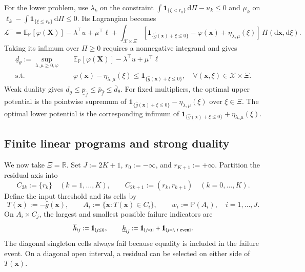 \documentclass[review,11pt,3p,authoryear,nopreprintline]{elsarticle}
\begin{document}
For the lower problem, use $\lambda_k$ on the constraint
$\int\mathbf1_{\{\xi<r_k\}}\,\mathrm d\Pi-u_k\le0$ and $\mu_k$ on
$\ell_k-\int\mathbf1_{\{\xi\le r_k\}}\,\mathrm d\Pi\le0$. Its Lagrangian becomes
\[
  \mathcal L^-
  =
  \mathbb E_{\mathbb P}[\varphi(\bm X)]
  -\lambda^\top u+\mu^\top\ell
  +\int_{\mathcal X\times\Xi}
  \left[\mathbf1_{\{\hat g(\bm x)+\xi\le0\}}-\varphi(\bm x)
  +\eta_{\lambda,\mu}(\xi)\right]\,\Pi(\mathrm d\bm x,\mathrm d\xi).
\]
Taking its infimum over $\Pi\ge0$ requires a nonnegative integrand and gives
\begin{equation}
  \begin{aligned}
    \underline d_\theta:=\sup_{\lambda,\mu\ge0,\varphi}\quad&
    \mathbb E_{\mathbb P}[\varphi(\bm X)]
    -\lambda^\top u+\mu^\top\ell\\
    \text{s.t.}\quad&
    \varphi(\bm x)-\eta_{\lambda,\mu}(\xi)
    \le\mathbf1_{\{\hat g(\bm x)+\xi\le0\}},
    \quad\forall(\bm x,\xi)\in\mathcal X\times\Xi.
  \end{aligned}
  \label{eq-lower-measure-dual}
\end{equation}
Weak duality gives
$\underline d_\theta\le\underline p_{\hat f}\le\overline p_{\hat f}\le\overline d_\theta$.
For fixed multipliers, the optimal upper potential is the pointwise supremum of
$\mathbf1_{\{\hat g(\bm x)+\xi\le0\}}-\eta_{\lambda,\mu}(\xi)$ over $\xi\in\Xi$.
The optimal lower potential is the corresponding infimum of
$\mathbf1_{\{\hat g(\bm x)+\xi\le0\}}+\eta_{\lambda,\mu}(\xi)$.

\subsection{Finite linear programs and strong duality}
\label{subsec-finite-duality}

We now take $\Xi=\mathbb R$. Set $J:=2K+1$, $r_0:=-\infty$, and $r_{K+1}:=+\infty$. Partition the residual axis into
\begin{equation}
  C_{2k}:=\{r_k\}\quad(k=1,\ldots,K),
  \qquad
  C_{2k+1}:=(r_k,r_{k+1})\quad(k=0,\ldots,K).
  \label{eq-residual-cells}
\end{equation}
Define the input threshold and its cells by
\begin{equation}
  T(\bm x):=-\hat g(\bm x),\qquad
  A_i:=\{\bm x:T(\bm x)\in C_i\},\qquad
  w_i:=\mathbb P(A_i),\quad i=1,\ldots,J.
  \label{eq-input-cells}
\end{equation}
On $A_i\times C_j$, the largest and smallest possible failure indicators are
\begin{equation}
  \overline h_{ij}:=\mathbf1_{\{j\le i\}},
  \qquad
  \underline h_{ij}:=\mathbf1_{\{j<i\}}
  +\mathbf1_{\{j=i,\ i\ {\rm even}\}}.
  \label{eq-cell-costs}
\end{equation}
The diagonal singleton cells always fail because equality is included in the failure event. On a diagonal open interval, a residual can be selected on either side of $T(\bm x)$.
\end{document}

